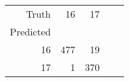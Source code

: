 \begin{table}[h]
\centering
\label{table:5}
\begin{tabular}{rrrrr}
\toprule
Truth & 16 & 17 \\
Predicted &  &  \\
\midrule
16 & 477 & 19 \\
17 & 1 & 370 \\
\bottomrule
\end{tabular}
\end{table}
